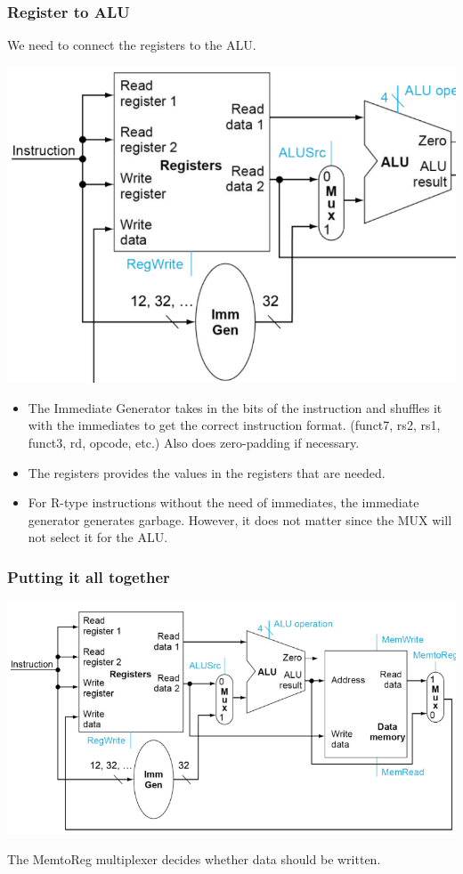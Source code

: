 \documentclass[10pt]{article}
\begin{document}
\subsubsection*{Register to ALU}
We need to connect the registers to the ALU.
\begin{center}
    \includegraphics*[scale=0.6]{W2_9.png}
\end{center}
\begin{itemize}
    \item The Immediate Generator takes in the bits of the instruction and shuffles it with the immediates to get the correct instruction format.  (funct7, rs2, rs1, funct3, rd, opcode, etc.)  Also does zero-padding if necessary.
    \item The registers provides the values in the registers that are needed.
    \item For R-type instructions without the need of immediates, the immediate generator generates garbage.  However, it does not matter since the MUX will not select it for the ALU.
\end{itemize}
\subsubsection*{Putting it all together}
\begin{center}
    \includegraphics*[scale=0.7]{W2_10.png}
\end{center}
The MemtoReg multiplexer decides whether data should be written.
\end{document}
